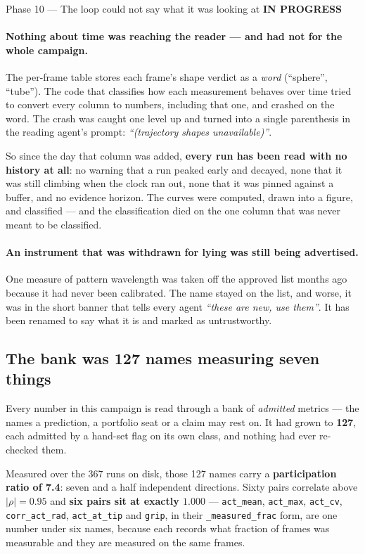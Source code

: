 \documentclass[11pt,a4paper]{article}
\newcommand{\code}[1]{\texttt{#1}}
\newcommand{\prog}{\textcolor{warn}{\textbf{IN PROGRESS}}}
\begin{document}
\begin{phasebox}{Phase 10 --- The loop could not say what it was looking at \hfill \prog}
\paragraph{Nothing about time was reaching the reader --- and had not for the whole campaign.}
The per-frame table stores each frame's shape verdict as a \emph{word} (``sphere'', ``tube'').
The code that classifies how each measurement behaves over time tried to convert every column to
numbers, including that one, and crashed on the word. The crash was caught one level up and
turned into a single parenthesis in the reading agent's prompt: \emph{``(trajectory shapes
unavailable)''}.

So since the day that column was added, \textbf{every run has been read with no history at all}:
no warning that a run peaked early and decayed, none that it was still climbing when the clock
ran out, none that it was pinned against a buffer, and no evidence horizon. The curves were
computed, drawn into a figure, and classified --- and the classification died on the one column
that was never meant to be classified.

\paragraph{An instrument that was withdrawn for lying was still being advertised.} One measure of
pattern wavelength was taken off the approved list months ago because it had never been
calibrated. The name stayed on the list, and worse, it was in the short banner that tells every
agent \emph{``these are new, use them''}. It has been renamed to say what it is and marked as
untrustworthy.

\subsection*{The bank was 127 names measuring seven things}
Every number in this campaign is read through a bank of \emph{admitted} metrics --- the names a
prediction, a portfolio seat or a claim may rest on. It had grown to \textbf{127}, each admitted by
a hand-set flag on its own class, and nothing had ever re-checked them.

Measured over the 367 runs on disk, those 127 names carry a \textbf{participation ratio of 7.4}:
seven and a half independent directions. Sixty pairs correlate above $|\rho|=0.95$ and
\textbf{six pairs sit at exactly $1.000$} --- \code{act\_mean}, \code{act\_max}, \code{act\_cv},
\code{corr\_act\_rad}, \code{act\_at\_tip} and \code{grip}, in their \code{\_measured\_frac} form,
are one number under six names, because each records what fraction of frames was measurable and
they are measured on the same frames.


\end{phasebox}
\end{document}
